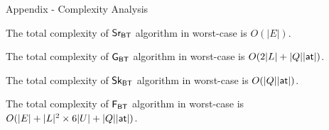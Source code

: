 \begin{frame}[fragile]{Appendix - Complexity Analysis}
  \begin{complexity}
    The total complexity of $\mathsf{Sr_{BT}}$ algorithm in worst-case is $O(|E|)$.
  \end{complexity}
  \begin{complexity}\label{comp:anal:gen}
    The total complexity of $\mathsf{G_{BT}}$ algorithm in worst-case is $O(2|L| + |Q||\mathsf{at}|)$.
  \end{complexity}    
  \begin{complexity}
    The total complexity of $\mathsf{Sk_{BT}}$ algorithm in worst-case is $O(|Q||\mathsf{at}|)$.
  \end{complexity}
  \begin{complexity}
    The total complexity of $\mathsf{F_{BT}}$ algorithm in worst-case is $O(|E| + |L|^2 \times 6|U| + |Q||\mathsf{at}|)$.
  \end{complexity}
    
\end{frame}


